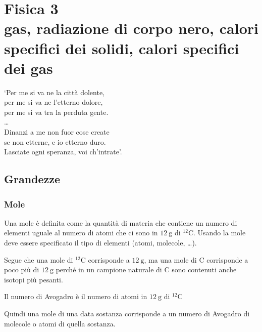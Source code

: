 \part[Fisica 3]{Fisica 3\\\vspace{1cm}\large{gas, radiazione di corpo nero, calori specifici dei solidi, calori specifici dei gas}}
\begin{savequote}[6cm]
	`Per me si va ne la città dolente,\\ per me si va ne l'etterno dolore,\\ per me si va tra la perduta gente.\\
	\ldots\\
	Dinanzi a me non fuor cose create\\ se non etterne, e io etterno duro.\\ Lasciate ogni speranza, voi ch'intrate'.
\end{savequote}
\chapter{Grandezze}
\minitoc
\section{Mole}
\begin{Def}[mole]
	Una mole è definita come la quantità di materia che contiene un numero di elementi uguale al numero di atomi che ci sono in $\SI{12}{\gram}$ di $^{12}\mathrm{C}$. Usando la mole deve essere specificato il tipo di elementi (atomi, molecole, \ldots).
\end{Def}
Segue che una mole di $^{12}\mathrm{C}$ corrisponde a $\SI{12}{\gram}$, ma una mole di $\mathrm{C}$ corrisponde a poco più di $\SI{12}{\gram}$ perché in un campione naturale di $\mathrm{C}$ sono contenuti anche isotopi più pesanti.
\begin{Def}
	Il numero di Avogadro è il numero di atomi in $\SI{12}{\gram}$ di $^{12}\mathrm{C}$
\end{Def}
Quindi una mole di una data sostanza corrisponde a un numero di Avogadro di molecole o atomi di quella sostanza.
